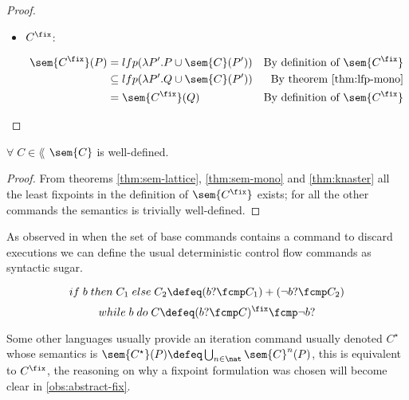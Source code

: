 \begin{definition}
\begin{proof}
\begin{itemize}
      \item $C^\fix$:

        \begin{align*}
          \sem{C^\fix}(P) 
            &= lfp(\lambda P'. P \cup \sem{C}(P'))
            &\text{By definition of $\sem{C^\fix}$}\\
            &\subseteq lfp(\lambda P'. Q \cup \sem{C}(P'))
            &\text{By theorem \ref{thm:lfp-mono}}\\
            &= \sem{C^\fix}(Q) 
            &\text{By definition of $\sem{C^\fix}$}\\
        \end{align*}

    \end{itemize}

  \end{proof}

  \begin{lemma}
    \label{thm:sem-welldef}
    $\forall \; C \in \lang$ $\sem{C}$ is well-defined.
  \end{lemma}
  \begin{proof}
    From theorems \ref{thm:sem-lattice}, \ref{thm:sem-mono} and 
    \ref{thm:knaster} all the least fixpoints in the definition of 
    $\sem{C^\fix}$ exists; for all the other commands the semantics is 
    trivially well-defined.
  \end{proof}

  \begin{observation}
    As observed in \cite{Fischer79} when the set of base commands contains a 
    command to discard executions we can define the usual deterministic control 
    flow commands as syntactic sugar.

    $$if \; b \; then \; C_1 \; else \; C_2 \defeq (b ? \fcmp C_1) 
    + (\neg b ? \fcmp C_2)$$
    $$while \; b \; do \; C \defeq (b? \fcmp C)^\fix \fcmp \neg b ?$$
  \end{observation}

  \begin{observation}
    Some other languages usually provide an iteration command usually denoted
    $C^\star$ whose semantics is $\sem{C^\star}(P) \defeq \bigcup_{n \in \nat}
    \sem{C}^n(P)$, this is equivalent to $C^\fix$, the reasoning on why a
    fixpoint formulation was chosen will become clear in 
    \ref{obs:abstract-fix}.
  \end{observation}

\end{definition}
